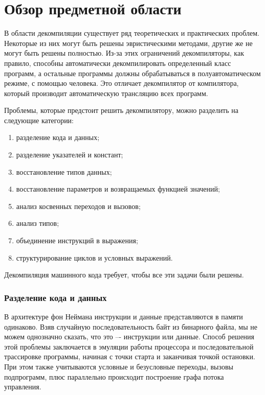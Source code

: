 \documentclass[14pt]{extarticle}
\begin{document}
\pagebreak

\section{Обзор предметной области}

В области декомпиляции существует ряд теоретических и практических проблем. Некоторые из них могут быть решены эвристическими методами, другие же не могут быть решены полностью. Из-за этих ограничений декомпиляторы, как правило, способны автоматически декомпилировать определенный класс программ, а остальные программы должны обрабатываться в полуавтоматическом режиме, с помощью человека. Это отличает декомпилятор от компилятора, который производит автоматическую трансляцию всех программ\cite{decompilation}.

Проблемы, которые предстоит решить декомпилятору, можно разделить на следующие категории:

\begin{enumerate}
\item разделение кода и данных;
\item разделение указателей и констант;
\item восстановление типов данных;
\item восстановление параметров и возвращаемых функцией значений;
\item анализ косвенных переходов и вызовов;
\item анализ типов;
\item объединение инструкций в выражения;
\item структурирование циклов и условных выражений.
\end{enumerate}

Декомпиляция машинного кода требует, чтобы все эти задачи были решены\cite{problems}.

\pagebreak

\subsubsection*{Разделение кода и данных}
В архитектуре фон Неймана инструкции и данные представляются в памяти одинаково. Взяв случайную последовательность байт из бинарного файла, мы не можем однозначно сказать, что это –- инструкции или данные. Способ решения этой проблемы заключается в эмуляции работы процессора и последовательной трассировке программы, начиная с точки старта и заканчивая точкой остановки. При этом также учитываются условные и безусловные переходы, вызовы подпрограмм, плюс параллельно происходит построение графа потока управления.
\end{document}
